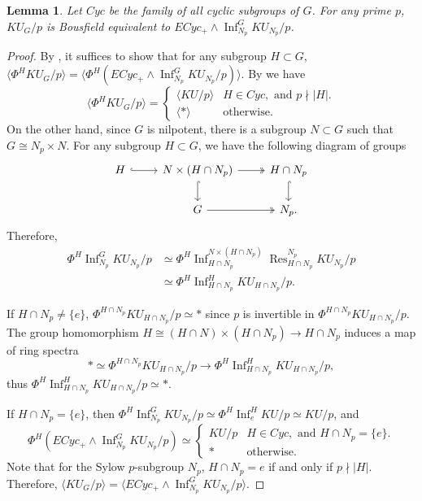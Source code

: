 \documentclass{amsart}
\theoremstyle{plain}
\newtheorem{lemma}[theorem]{Lemma}
\theoremstyle{definition}
\theoremstyle{remark}
\begin{document}
\begin{lemma}\label{lem:bousfield class of KU/p 1}
    Let $Cyc$ be the family of all cyclic subgroups of $G$. For any prime $p$, $KU_G/p$ is Bousfield equivalent to $ECyc_+ \wedge \operatorname{Inf}_{N_p}^G KU_{N_p}/p$.
\end{lemma}
\begin{proof}
    By \cite[Proposition 3.2]{hill2019equivariant}, it suffices to show that for any subgroup $H\subset G$, $\langle \Phi^H KU_G/p\rangle = \langle \Phi^H (ECyc_+\wedge \operatorname{Inf}_{N_p}^G KU_{N_p}/p)\rangle$. By  we have 
    \[
        \langle \Phi^H KU_G/p\rangle=\begin{cases}
            \langle KU/p\rangle  & H\in Cyc, \text{ and } p\nmid |H|.\\
            \langle \ast \rangle & \text{otherwise}.
        \end{cases}
    \]
    On the other hand, since $G$ is nilpotent, there is a subgroup $N\subset G$ such that $G\cong N_p\times N$. For any subgroup $H\subset G$, we have the following diagram of groups
    \[
    \begin{tikzcd}
        H\arrow[r, hook] & N\times (H\cap N_p) \arrow[r, twoheadrightarrow]\arrow[d, hook] & H\cap N_p\arrow[d, hook]\\
                &   G\arrow[r, twoheadrightarrow] & N_p   .
    \end{tikzcd}
    \]
    Therefore, 
    \[
    \begin{aligned}
        \Phi^H \operatorname{Inf}_{N_p}^G KU_{N_p}/p & \simeq \Phi^H \operatorname{Inf}_{H\cap N_p}^{N\times (H\cap N_p)}\operatorname{Res}_{H\cap N_p}^{N_p}KU_{N_p}/p\\
        &\simeq \Phi^H \operatorname{Inf}_{H\cap N_p}^{H}KU_{H\cap N_p}/p.
    \end{aligned}
    \]

    If $H\cap N_p\neq \{e\}$, $\Phi^{H\cap N_p} KU_{H\cap N_p}/p\simeq \ast$ since $p$ is invertible in $\Phi^{H\cap N_p}KU_{H\cap N_p}/p$. The group homomorphism $H\cong (H\cap N)\times (H\cap N_p)\to H\cap N_p$ induces a map of ring spectra
    \[\ast \simeq \Phi^{H\cap N_p} KU_{H\cap N_p}/p\to \Phi^H \operatorname{Inf}_{H\cap N_p}^H KU_{H\cap N_p}/p,\] 
    thus $\Phi^H\operatorname{Inf}_{H\cap N_p}^H KU_{H\cap N_p}/p\simeq \ast$.
    
    If $H\cap N_p=\{e\}$, then $\Phi^H\operatorname{Inf}_{N_p}^G KU_{N_p}/p\simeq \Phi^H\operatorname{Inf}_e^H KU/p\simeq KU/p$, and
    \[
    \Phi^H(ECyc_+\wedge \operatorname{Inf}_{N_p}^G KU_{N_p}/p)\simeq \begin{cases}
        KU/p & H\in Cyc, \text{ and } H\cap N_p=\{e\}.\\
        \ast & \text{otherwise.}
    \end{cases}
    \]
    Note that for the Sylow $p$-subgroup $N_p$, $H\cap N_p=e$ if and only if $p\nmid |H|$. Therefore, $\langle KU_G/p\rangle=\langle  ECyc_+\wedge \operatorname{Inf}_{N_p}^G KU_{N_p}/p \rangle$.
\end{proof}
\end{document}
